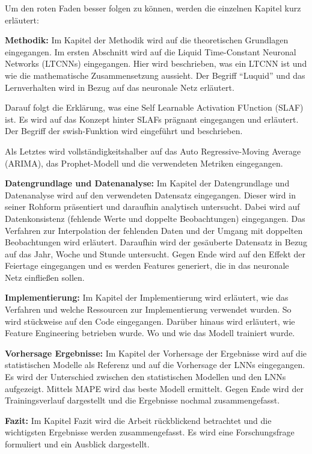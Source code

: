 \documentclass[11pt,ngerman,a4paper,]{article}
\begin{document}
Um den roten Faden besser folgen zu können, werden die einzelnen Kapitel kurz erläutert:

\textbf{Methodik:} Im Kapitel der Methodik wird auf die theoretischen Grundlagen eingegangen. Im ersten Abschnitt wird auf die Liquid Time-Constant Neuronal Networks (LTCNNs) eingegangen. Hier wird beschrieben, was ein LTCNN ist und wie die mathematische Zusammensetzung aussieht. Der Begriff ``Luquid'' und das Lernverhalten wird in Bezug auf das neuronale Netz erläutert.

Darauf folgt die Erklärung, was eine Self Learnable Activation FUnction (SLAF) ist. Es wird auf das Konzept hinter SLAFs prägnant eingegangen und erläutert. Der Begriff der swish-Funktion wird eingeführt und beschrieben.

Als Letztes wird vollständigkeitshalber auf das Auto Regressive-Moving Average (ARIMA), das Prophet-Modell und die verwendeten Metriken eingegangen.

\textbf{Datengrundlage und Datenanalyse:} Im Kapitel der Datengrundlage und Datenanalyse wird auf den verwendeten Datensatz eingegangen. Dieser wird in seiner Rohform präsentiert und daraufhin analytisch untersucht. Dabei wird auf Datenkonsistenz (fehlende Werte und doppelte Beobachtungen) eingegangen. Das Verfahren zur Interpolation der fehlenden Daten und der Umgang mit doppelten Beobachtungen wird erläutert. Daraufhin wird der gesäuberte Datensatz in Bezug auf das Jahr, Woche und Stunde untersucht. Gegen Ende wird auf den Effekt der Feiertage eingegangen und es werden Features generiert, die in das neuronale Netz einfließen sollen.

\textbf{Implementierung:} Im Kapitel der Implementierung wird erläutert, wie das Verfahren und welche Ressourcen zur Implementierung verwendet wurden. So wird stückweise auf den Code eingegangen. Darüber hinaus wird erläutert, wie Feature Engineering betrieben wurde. Wo und wie das Modell trainiert wurde.

\textbf{Vorhersage Ergebnisse:} Im Kapitel der Vorhersage der Ergebnisse wird auf die statistischen Modelle als Referenz und auf die Vorhersage der LNNs eingegangen. Es wird der Unterschied zwischen den statistischen Modellen und den LNNs aufgezeigt. Mittels MAPE wird das beste Modell ermittelt. Gegen Ende wird der Trainingsverlauf dargestellt und die Ergebnisse nochmal zusammengefasst.

\textbf{Fazit:} Im Kapitel Fazit wird die Arbeit rückblickend betrachtet und die wichtigsten Ergebnisse werden zusammengefasst. Es wird eine Forschungsfrage formuliert und ein Ausblick dargestellt.
\end{document}
